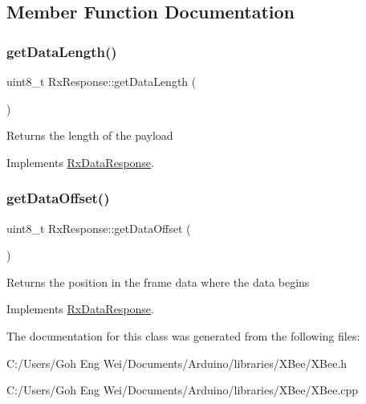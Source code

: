 \subsection{Member Function Documentation}
\hypertarget{class_rx_response_add3478a1ce5667aad315f6a6c218011a}{}\label{class_rx_response_add3478a1ce5667aad315f6a6c218011a} 
\subsubsection{\texorpdfstring{get\+Data\+Length()}{getDataLength()}}
{\footnotesize\ttfamily uint8\+\_\+t Rx\+Response\+::get\+Data\+Length (\begin{DoxyParamCaption}{ }\end{DoxyParamCaption})\hspace{0.3cm}{\ttfamily [virtual]}}

Returns the length of the payload 

Implements \hyperlink{class_rx_data_response_a5845e6a0719fd0bf52675e47053a704e}{Rx\+Data\+Response}.

\hypertarget{class_rx_response_a37fd3ee455f2157fa3894e710e668409}{}\label{class_rx_response_a37fd3ee455f2157fa3894e710e668409} 
\subsubsection{\texorpdfstring{get\+Data\+Offset()}{getDataOffset()}}
{\footnotesize\ttfamily uint8\+\_\+t Rx\+Response\+::get\+Data\+Offset (\begin{DoxyParamCaption}{ }\end{DoxyParamCaption})\hspace{0.3cm}{\ttfamily [virtual]}}

Returns the position in the frame data where the data begins 

Implements \hyperlink{class_rx_data_response_a9e4b6bf4f1bfd9ccec45d190a204f61a}{Rx\+Data\+Response}.



The documentation for this class was generated from the following files\+:\begin{DoxyCompactItemize}
\item 
C\+:/\+Users/\+Goh Eng Wei/\+Documents/\+Arduino/libraries/\+X\+Bee/X\+Bee.\+h\item 
C\+:/\+Users/\+Goh Eng Wei/\+Documents/\+Arduino/libraries/\+X\+Bee/X\+Bee.\+cpp\end{DoxyCompactItemize}
